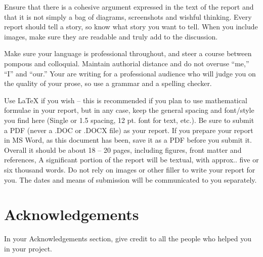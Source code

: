 \documentclass[]{UCD_CS_FYP_Report}
\begin{document}
Ensure that there is a cohesive argument expressed in the text of the report and that it is not simply a bag of diagrams, screenshots and wishful thinking. Every report should tell a story, so know what story you want to tell. When you include images, make sure they are readable and truly add to the discussion.
	
Make sure your language is professional throughout, and steer a course between pompous and colloquial. Maintain authorial distance and do not overuse “me,” “I” and “our.” Your are writing for a professional audience who will judge you on the quality of your prose, so use a grammar and a spelling checker. 

Use LaTeX if you wish – this is recommended if you plan to use mathematical formulae in your report, but in any case, keep the general spacing and font/style you find here (Single or 1.5 spacing, 12 pt. font for text, etc.). Be sure to submit a PDF (never a .DOC or .DOCX file) as your report. If you prepare your report in MS Word, as this document has been, save it as a PDF before you submit it. Overall it should be about 18 – 20 pages, including figures, front matter and references, A significant portion of the report will be textual, with approx.. five or six thousand words. Do not rely on images or other filler to write your report for you. 
The dates and means of submission will be communicated to you separately.





\chapter*{Acknowledgements}
In your Acknowledgements section, give credit to all the people who helped you in your project.


\printbibliography


\end{document}
